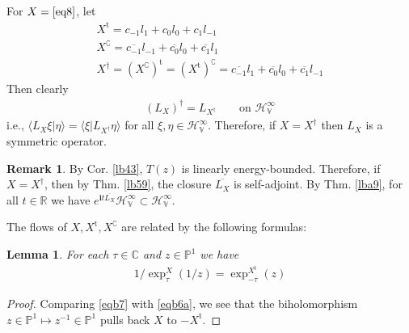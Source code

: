 \documentclass[12pt,b5paper,notitlepage]{article}
\theoremstyle{definition}
\newtheorem{rem}[df]{Remark}
\theoremstyle{plain}
\newtheorem{lm}[df]{Lemma}
\newcommand{\ovl}{\overline}
\newcommand{\tr}{\mathrm{t}} %
\newcommand{\bk}[1]{\langle {#1}\rangle}
\newcommand{\im}{\mathbf{i}}
\newcommand{\Co}{\complement}
\newcommand{\Cbb}{\mathbb C}
\newcommand{\Pbb}{\mathbb P}
\newcommand{\Rbb}{\mathbb R}
\newcommand{\HV}{\mathcal H_{\mathbb V}}
\numberwithin{equation}{section}
\begin{document}
\subsection{}
For $X=\eqref{eq8}$, let
\begin{subequations}\label{eqb6}
\begin{gather}
X^\tr=c_{-1}l_1+c_0l_0+c_1l_{-1}\label{eqb6a}\\
X^\Co=\ovl {c_{-1}}l_{-1}+\ovl{c_0}l_0+\ovl {c_1} l_1\\
 X^\dagger=(X^\Co)^\tr=(X^\tr)^\Co=\ovl {c_{-1}}l_1+\ovl {c_0}l_0+\ovl {c_1} l_{-1}
\end{gather}
\end{subequations}
Then clearly
\begin{align*}
(L_X)^\dagger=L_{X^\dagger}\qquad\text{on $\HV^\infty$}
\end{align*}
i.e., $\bk{L_X\xi|\eta}=\bk{\xi|L_{X^\dagger}\eta}$ for all $\xi,\eta\in\HV^\infty$. Therefore, if $X=X^\dagger$ then $L_X$ is a symmetric operator.

\begin{rem}
By Cor. \ref{lb43}, $T(z)$ is linearly energy-bounded. Therefore, if $X=X^\dagger$, then by Thm. \ref{lb59}, the closure $\ovl{L_X}$ is self-adjoint. By Thm. \ref{lba9}, for all $t\in\Rbb$ we have $e^{\im t\ovl{L_X}}\HV^\infty\subset\HV^\infty$.
\end{rem}


The flows of  $X,X^\tr,X^\Co$ are related by the following formulas:

\begin{lm}\label{lb73}
For each $\tau\in\Cbb$ and $z\in\Pbb^1$ we have
\begin{align}\label{eqb9}
1/\exp_\tau^X(1/z)=\exp_{-\tau}^{X^\tr}(z)
\end{align}
\end{lm}
\begin{proof}
Comparing \eqref{eqb7} with \eqref{eqb6a}, we see that the biholomorphism $z\in\Pbb^1\mapsto z^{-1}\in\Pbb^1$ pulls back $X$ to $-X^\tr$.
\end{proof}
\end{document}
